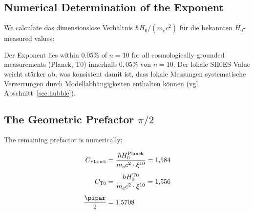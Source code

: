 \subsection{Numerical Determination of the Exponent}

We calculate das dimensionslose Verhältnis $\hbar H_0 / (m_e c^2)$ für die
bekannten $H_0$-measured values:

\begin{table}[H]
    \centering
    \caption{Dimensionsloses Verhältnis $\hbar H_0 / m_e c^2$ und zugehöriger
    $\xi$-Exponent für verschiedene $H_0$-Messungen.
    Der Exponent wird definiert durch $\hbar H_0 / m_e c^2 = C \cdot \xi^n$,
    $C \equiv \pi/2$.}
    \label{tab:exponents}
\end{table}

Der Exponent lies within 0.05\% of $n=10$ for all cosmologically grounded measurements (Planck, T0)
innerhalb $0{,}05\%$ von $n = 10$. Der lokale SH0ES-Value weicht stärker ab,
was konsistent damit ist, dass lokale Messungen systematische Verzerrungen
durch Modellabhängigkeiten enthalten können (vgl. Abschnitt~\ref{sec:hubble}).

\subsection{The Geometric Prefactor \texorpdfstring{$\pi/2$}{pi/2}}

The remaining prefactor is numerically:

\begin{align}
    C_{\text{Planck}} &= \frac{\hbar H_0^{\text{Planck}}}{m_e c^2 \cdot \xi^{10}}
    = 1{,}584 \\[4pt]
    C_{\text{T0}}     &= \frac{\hbar H_0^{\text{T0}}}{m_e c^2 \cdot \xi^{10}}
    = 1{,}556 \\[4pt]
    \frac{\pipar}{2}     &= 1{,}5708
\end{align}


